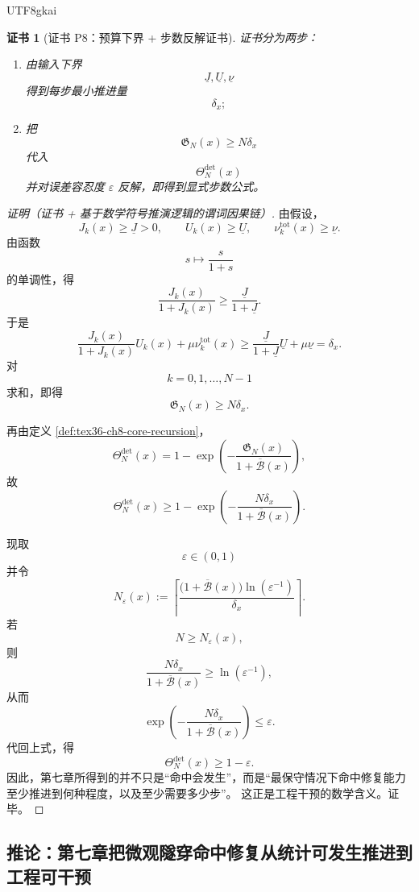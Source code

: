 \documentclass[12pt]{article}
\newtheorem{Certificate}{证书}[section]
\begin{document}
\begin{CJK*}{UTF8}{gkai}
\begin{Certificate}[证书 P8：预算下界 + 步数反解证书]
\label{cert:tex36-p8}
证书分为两步：
\begin{enumerate}
  \item 由输入下界
  \[
    \underline J,\underline U,\underline \nu
  \]
  得到每步最小推进量
  \[
    \delta_x;
  \]
  \item 把
  \[
    \mathfrak G_N(x)\ge N\delta_x
  \]
  代入
  \[
    \Theta_N^{\mathrm{det}}(x)
  \]
  并对误差容忍度 $\varepsilon$ 反解，即得到显式步数公式。
\end{enumerate}
\end{Certificate}

\begin{proof}[证明（证书 + 基于数学符号推演逻辑的谓词因果链）]
由假设，
\[
  J_k(x)\ge \underline J>0,
  \qquad
  U_k(x)\ge \underline U,
  \qquad
  \nu_k^{\mathrm{tot}}(x)\ge \underline \nu.
\]
由函数
\[
  s\mapsto \frac{s}{1+s}
\]
的单调性，得
\[
  \frac{J_k(x)}{1+J_k(x)}
  \ge
  \frac{\underline J}{1+\underline J}.
\]
于是
\[
  \frac{J_k(x)}{1+J_k(x)}U_k(x)
  +
  \mu\nu_k^{\mathrm{tot}}(x)
  \ge
  \frac{\underline J}{1+\underline J}\underline U
  +
  \mu\underline \nu
  =
  \delta_x.
\]
对
\[
  k=0,1,\ldots,N-1
\]
求和，即得
\[
  \mathfrak G_N(x)\ge N\delta_x.
\]

再由定义 \ref{def:tex36-ch8-core-recursion}，
\[
  \Theta_N^{\mathrm{det}}(x)
  =
  1-\exp\left(
    -\frac{\mathfrak G_N(x)}{1+\overline{\mathcal B}(x)}
  \right),
\]
故
\[
  \Theta_N^{\mathrm{det}}(x)
  \ge
  1-\exp\left(
    -\frac{N\delta_x}{1+\overline{\mathcal B}(x)}
  \right).
\]

现取
\[
  \varepsilon\in(0,1)
\]
并令
\[
  N_\varepsilon(x)
  :=
  \left\lceil
    \frac{
      \bigl(1+\overline{\mathcal B}(x)\bigr)\ln(\varepsilon^{-1})
    }{\delta_x}
  \right\rceil.
\]
若
\[
  N\ge N_\varepsilon(x),
\]
则
\[
  \frac{N\delta_x}{1+\overline{\mathcal B}(x)}
  \ge
  \ln(\varepsilon^{-1}),
\]
从而
\[
  \exp\left(
    -\frac{N\delta_x}{1+\overline{\mathcal B}(x)}
  \right)
  \le
  \varepsilon.
\]
代回上式，得
\[
  \Theta_N^{\mathrm{det}}(x)\ge 1-\varepsilon.
\]
因此，第七章所得到的并不只是“命中会发生”，而是“最保守情况下命中修复能力至少推进到何种程度，以及至少需要多少步”。
这正是工程干预的数学含义。证毕。
\end{proof}

\subsection{推论：第七章把微观隧穿命中修复从统计可发生推进到工程可干预}
\label{subsec:tex36-ch8-corollary}


\end{CJK*}
\end{document}

